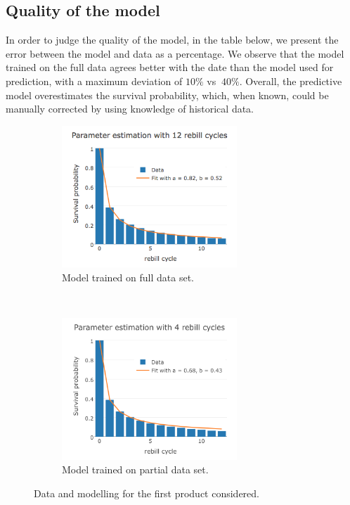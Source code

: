 \documentclass[paper=a4, fontsize=11pt]{scrartcl} %
\numberwithin{equation}{section} %
\numberwithin{figure}{section} %
\numberwithin{table}{section} %
\begin{document}
\subsection{Quality of the model}

In order to judge the quality of the model, in the table below, we present the error between the model and data as a percentage. We observe that the model trained on the full data agrees better with the date than the model used for prediction, with a maximum deviation of $10\%$ vs $~40\%$. Overall, the predictive model overestimates the survival probability, which, when known, could be manually corrected by using knowledge of historical data. 

\begin{figure}[t!]
	\centering
	\begin{subfigure}[b]{0.5\textwidth}
		\centering
		\includegraphics[height=2.1in]{./figures/VR12cycles.png}
		\caption{Model trained on full data set.}
	\end{subfigure}%
	~ 
	\begin{subfigure}[b]{0.5\textwidth}
		\centering
		\includegraphics[height=2.1in]{./figures/VR4cycles.png}
		\caption{Model trained on partial data set.}
	\end{subfigure}
	\caption{Data and modelling for the first product considered.}
	\label{Frobenius}
\end{figure}
\end{document}
